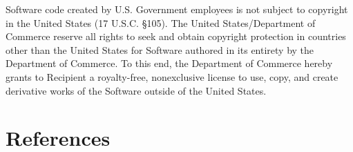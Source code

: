 \documentclass[
  letterpaper,
  oneside,
  open=any]{scrbook}
\begin{document}
Software code created by U.S. Government employees is not subject to
copyright in the United States (17 U.S.C. §105). The United
States/Department of Commerce reserve all rights to seek and obtain
copyright protection in countries other than the United States for
Software authored in its entirety by the Department of Commerce. To this
end, the Department of Commerce hereby grants to Recipient a
royalty-free, nonexclusive license to use, copy, and create derivative
works of the Software outside of the United States.

\hypertarget{references}{%
\chapter*{References}\label{references}}

\end{document}
